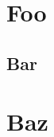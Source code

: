 \documentclass{article}
\begin{document}
\section{Foo}

\subsection{Bar}

\section{Baz}
\end{document}

